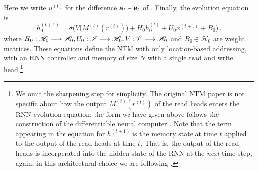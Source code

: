 \documentclass[english,letter paper,12pt,leqno]{article}
\theoremstyle{example}
\numberwithin{equation}{section}
\def\be{\begin{equation}}
\def\ee{\end{equation}}
\begin{document}
Here we write $u^{(t)}$ for the difference $\bold{a}_t - \bold{e}_t$ of \cite[\S 3.2]{ntm}. Finally, the evolution equation is
\be\label{eq:NTMequation}
h_0^{(t+1)} = \sigma\Big( V\big( M^{(t)}(r^{(t)}) \big) + H_0 h_0^{(t)} + U_0 x^{(t+1)} + B_0 \Big)\,.
\ee 
where $H_0: \mathscr{H}_0 \longrightarrow \mathscr{H}_0, U_0: \mathscr{I} \longrightarrow \mathscr{H}_0, V: \mathscr{V} \longrightarrow \mathscr{H}_0$ and $B_0 \in \mathscr{H}_0$ are weight matrices. These equations define the NTM with only location-based addressing, with an RNN controller and memory of size $N$ with a single read and write head.\footnote{We omit the sharpening step \cite[Eq. (9)]{ntm} for simplicity. The original NTM paper \cite{ntm} is not specific about how the output $M^{(t)}(r^{(t)})$ of the read heads enters the RNN evolution equation; the form we have given above follows the construction of the differentiable neural computer \cite[p. 7]{dnc}. Note that the term appearing in the equation for $h^{(t+1)}$ is the memory state at time $t$ applied to the output of the read heads at time $t$. That is, the output of the read heads is incorporated into the hidden state of the RNN at the \emph{next} time step; again, in this architectural choice we are following \cite{dnc}.}
\\
\end{document}

